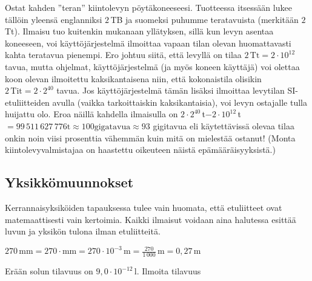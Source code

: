 \begin{esimerkki}
Ostat kahden ''teran'' kiintolevyn pöytäkoneeseesi. Tuotteessa itsessään lukee tällöin yleensä englanniksi $2$\,TB ja suomeksi puhumme teratavuista (merkitään $2$\,Tt). Ilmaisu tuo kuitenkin mukanaan yllätyksen, sillä kun levyn asentaa koneeseen, voi käyttöjärjestelmä ilmoittaa vapaan tilan olevan huomattavasti kahta teratavua pienempi. Ero johtuu siitä, että levyllä on tilaa $2\,\textrm{Tt}=2\cdot 10^{12}$ tavua, mutta ohjelmat, käyttöjärjestelmä (ja myös koneen käyttäjä) voi olettaa koon olevan ilmoitettu kaksikantaisena niin, että kokonaistila olisikin $2\,\textrm{Tit}=2\cdot 2^{40}$ tavua. Jos käyttöjärjestelmä tämän lisäksi ilmoittaa levytilan SI-etuliitteiden avulla (vaikka tarkoittaiskin kaksikantaisia), voi levyn ostajalle tulla huijattu olo. Eroa näillä kahdella ilmaisulla on $2\cdot 2^{40}\,$t$-2\cdot 10^{12}\,$t$=99\,511\,627\,776\textrm{t}\approx 100 \text{gigatavua} \approx 93$ gigitavua eli käytettävissä olevaa tilaa onkin noin viisi prosenttia vähemmän kuin mitä on mielestää ostanut! (Monta kiintolevyvalmistajaa on haastettu oikeuteen näistä epämääräisyyksistä.)
\end{esimerkki}

\subsection{Yksikkömuunnokset}

Kerrannaisyksiköiden tapauksessa tulee vain huomata, että etuliitteet ovat matemaattisesti vain kertoimia. Kaikki ilmaisut voidaan aina halutessa esittää luvun ja yksikön tulona ilman etuliitteitä.

\begin{esimerkki}
$270\,\text{mm}=270\cdot\text{mm}=270\cdot10^{-3}\,\text{m}=\frac{270}{1\,000}\,\text{m}=0,27\,\text{m}$
\end{esimerkki}

\begin{esimerkki}
Erään solun tilavuus on $9,0 \cdot 10^{-12}$\,l. Ilmoita tilavuus
	\begin{esimratk}
	\end{esimratk}
\end{esimerkki}


